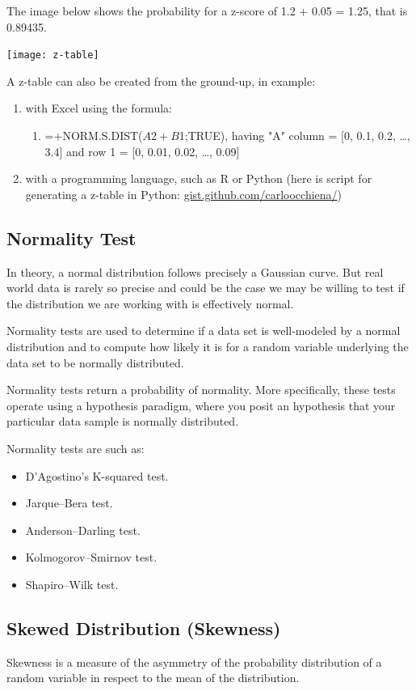 \documentclass{article}
\begin{document}
The image below shows the probability for a z-score of 1.2 + 0.05 = 1.25, that is 0.89435.

\texttt{[image: z-table]}

A z-table can also be created from the ground-up, in example: 
\begin{enumerate}
    \item with Excel using the formula:
    \begin{enumerate}
        \item =+NORM.S.DIST($A2+B$1;TRUE), having "A" column = [0, 0.1, 0.2, …, 3.4] and row 1 = [0, 0.01, 0.02, …, 0.09]
    \end{enumerate}
    \item with a programming language, such as R or Python (here is script for generating a z-table in Python: \href{https://gist.github.com/carloocchiena/f65e1381a30004352561a606ee0ba51a}{gist.github.com/carloocchiena/})
\end{enumerate}

\subsection{Normality Test}
In theory, a normal distribution follows precisely a Gaussian curve. But real world data is rarely so precise and could be the case we may be willing to test if the distribution we are working with is effectively normal.

Normality tests are used to determine if a data set is well-modeled by a normal distribution and to compute how likely it is for a random variable underlying the data set to be normally distributed. 

Normality tests return a probability of normality. More specifically, these tests operate using a hypothesis paradigm, where you posit an hypothesis that your particular data sample is normally distributed. 

Normality tests are such as:
\begin{itemize}
    \item D'Agostino's K-squared test.
    \item Jarque–Bera test.
    \item Anderson–Darling test.
    \item Kolmogorov–Smirnov test.
    \item Shapiro–Wilk test.
\end{itemize}

\subsection{Skewed Distribution (Skewness)}
Skewness is a measure of the asymmetry of the probability distribution of a random variable in respect to the mean of the distribution. 
\end{document}
